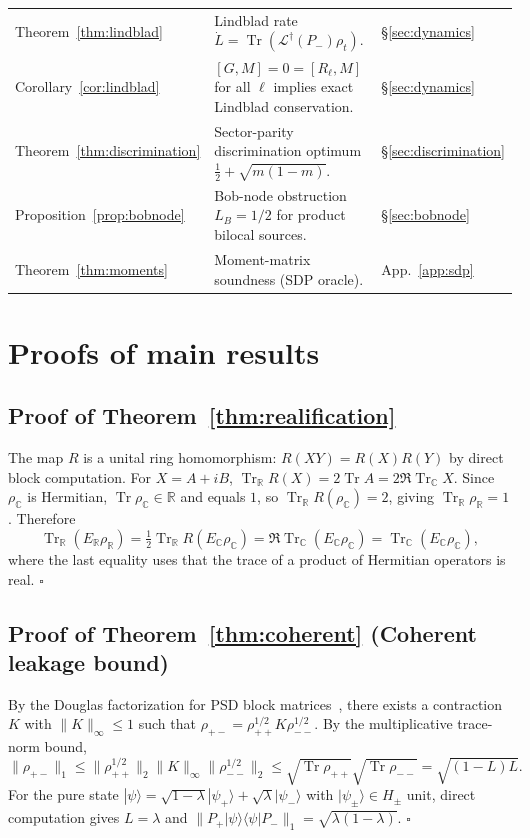 \documentclass[a4paper,onecolumn,noarxiv]{quantumarticle}
\theoremstyle{plain}
\theoremstyle{definition}
\theoremstyle{remark}
\newcommand{\R}{\mathbb{R}}
\newcommand{\C}{\mathbb{C}}
\newcommand{\Pplus}{P_{+}}
\newcommand{\Pminus}{P_{-}}
\newcommand{\Mop}{M}
\newcommand{\Tr}{\operatorname{Tr}}
\newcommand{\Ldag}{\mathcal{L}^{\dagger}}
\newcommand{\Lleak}{L}
\begin{document}
\begin{center}
\begin{tabular}{@{}lll@{}}
Theorem~\ref{thm:lindblad}
  & Lindblad rate $\dot\Lleak=\Tr(\Ldag(\Pminus)\rho_t)$.
  & \S\ref{sec:dynamics} \\
Corollary~\ref{cor:lindblad}
  & $[G,\Mop]=0=[R_\ell,\Mop]$ for all $\ell$ implies exact Lindblad conservation.
  & \S\ref{sec:dynamics} \\
Theorem~\ref{thm:discrimination}
  & Sector-parity discrimination optimum $\tfrac{1}{2}+\sqrt{m(1-m)}$.
  & \S\ref{sec:discrimination} \\
Proposition~\ref{prop:bobnode}
  & Bob-node obstruction $\Lleak_B=1/2$ for product bilocal sources.
  & \S\ref{sec:bobnode} \\
Theorem~\ref{thm:moments}
  & Moment-matrix soundness (SDP oracle).
  & App.~\ref{app:sdp} \\
\bottomrule
\end{tabular}
\end{center}

\section{Proofs of main results}
\label{app:proofs}

\subsection*{Proof of Theorem~\ref{thm:realification}}

The map $R$ is a unital ring homomorphism: $R(XY)=R(X)R(Y)$ by direct block
computation. For $X=A+iB$, $\Tr_\R R(X)=2\Tr A=2\Re\Tr_\C X$. Since $\rho_\C$ is
Hermitian, $\Tr\rho_\C\in\R$ and equals $1$, so $\Tr_\R R(\rho_\C)=2$, giving
$\Tr_\R\rho_\R=1$. Therefore
\[
  \Tr_\R(E_\R\rho_\R) = \tfrac{1}{2}\Tr_\R R(E_\C\rho_\C)
  = \Re\Tr_\C(E_\C\rho_\C) = \Tr_\C(E_\C\rho_\C),
\]
where the last equality uses that the trace of a product of Hermitian operators is
real. \hfill$\square$

\subsection*{Proof of Theorem~\ref{thm:coherent} (Coherent leakage bound)}

By the Douglas factorization for PSD block matrices~\cite{Bhatia1997}, there exists a
contraction $K$ with $\|K\|_\infty\le 1$ such that $\rho_{+-}=\rho_{++}^{1/2}K\rho_{--}^{1/2}$.
By the multiplicative trace-norm bound,
\[
  \|\rho_{+-}\|_1 \le \|\rho_{++}^{1/2}\|_2\|K\|_\infty\|\rho_{--}^{1/2}\|_2
  \le \sqrt{\Tr\rho_{++}}\sqrt{\Tr\rho_{--}} = \sqrt{(1-\Lleak)\Lleak}.
\]
For the pure state $|\psi\rangle=\sqrt{1-\lambda}|\psi_+\rangle+\sqrt{\lambda}|\psi_-\rangle$
with $|\psi_\pm\rangle\in H_\pm$ unit, direct computation gives $\Lleak=\lambda$ and
$\|\Pplus|\psi\rangle\langle\psi|\Pminus\|_1=\sqrt{\lambda(1-\lambda)}$. \hfill$\square$
\end{document}
